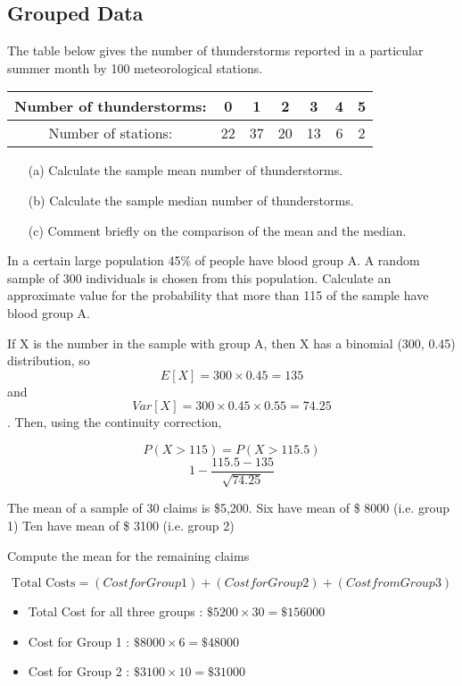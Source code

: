\documentclass[]{report}
\begin{document}



\subsection{Grouped Data}

The table below gives the number of thunderstorms reported in a particular summer
month by 100 meteorological stations.

\begin{tabular}{|c|c|c|c|c|c|c|}
	Number of thunderstorms: &0& 1 &2 &3 &4 &5 \\ \hline
	Number of stations: & 22 & 37 & 20 & 13 & 6 & 2 \\ \hline
\end{tabular}

\begin{itemize}
	\item[(a)] Calculate the sample mean number of thunderstorms.
	\item[(b)] Calculate the sample median number of thunderstorms.
	\item[(c)] Comment briefly on the comparison of the mean and the median.
\end{itemize}
In a certain large population 45\% of people have blood group A. 
A random sample of 300 individuals is chosen from this population.
Calculate an approximate value for the probability that more than 115 of the sample
have blood group A.

If X is the number in the sample with group A, then X has a binomial (300, 0.45)
distribution, so
\[ E[X] = 300 \times 0.45 = 135 \] and 
\[ Var[X] = 300 \times 0.45 \times 0.55 = 74.25 \].
Then, using the continuity correction,

\[ P(X > 115) = P(X > 115.5)\]
\[ 1- \frac{115.5 - 135}{\sqrt{74.25} } \]

The mean of a sample of 30 claims is \$5,200.
Six have mean of \$ 8000 (i.e. group 1)
Ten have mean of \$ 3100 (i.e. group 2)

Compute the mean for the remaining claims

\[\mbox{Total Costs} = (Cost for Group 1) + (Cost for Group 2) + (Cost from Group 3)\]

\begin{itemize}
	\item Total Cost for all three groups : $\$5200 \times 30 = \$156000$
	\item Cost for Group 1 : $\$8000 \times 6 = \$48000$
	\item Cost for Group 2 : $\$3100 \times 10 = \$31000$
\end{itemize}
\end{document}
